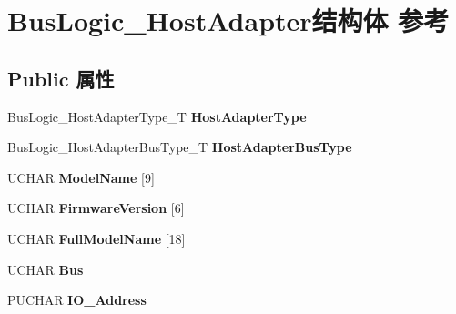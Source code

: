 \hypertarget{struct_bus_logic___host_adapter}{}\section{Bus\+Logic\+\_\+\+Host\+Adapter结构体 参考}
\label{struct_bus_logic___host_adapter}
\subsection*{Public 属性}
\begin{DoxyCompactItemize}
\item 
\mbox{\label{struct_bus_logic___host_adapter_a00fe69c001046eb45e24cbecfdfa488f}} 
Bus\+Logic\+\_\+\+Host\+Adapter\+Type\+\_\+T {\bfseries Host\+Adapter\+Type}
\item 
\mbox{\label{struct_bus_logic___host_adapter_abc1e55165584e2fc30821658476c40a8}} 
Bus\+Logic\+\_\+\+Host\+Adapter\+Bus\+Type\+\_\+T {\bfseries Host\+Adapter\+Bus\+Type}
\item 
\mbox{\label{struct_bus_logic___host_adapter_a72368530afd28d67cadd5f0fd8e810c6}} 
U\+C\+H\+AR {\bfseries Model\+Name} \mbox{[}9\mbox{]}
\item 
\mbox{\label{struct_bus_logic___host_adapter_a636863a2d3643222287504be0194c239}} 
U\+C\+H\+AR {\bfseries Firmware\+Version} \mbox{[}6\mbox{]}
\item 
\mbox{\label{struct_bus_logic___host_adapter_a9d5dfa0cd0591fe8aff6b1f7acdc4869}} 
U\+C\+H\+AR {\bfseries Full\+Model\+Name} \mbox{[}18\mbox{]}
\item 
\mbox{\label{struct_bus_logic___host_adapter_a238e765016d62b0261ce88a6f2048d7a}} 
U\+C\+H\+AR {\bfseries Bus}
\item 
\mbox{\label{struct_bus_logic___host_adapter_a285711b9ad2c73cc3cf36e617f5f20a1}} 
P\+U\+C\+H\+AR {\bfseries I\+O\+\_\+\+Address}
\item 
\mbox{\label{struct_bus_logic___host_adapter_a164df56eccb45303dc530910eb9a563d}} 

\end{DoxyCompactItemize}
